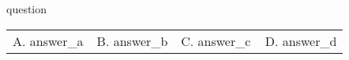 \begin{question}
    {{ question }}

    \begin{tabular}{ m{0.25\linewidth} m{0.25\linewidth} m{0.25\linewidth} m{0.25\linewidth}}
        A. {{ answer_a }}
        &
        B. {{ answer_b }}
        &
        C. {{ answer_c }}
        &
        D. {{ answer_d }}
        \\
    \end{tabular}
\end{question}